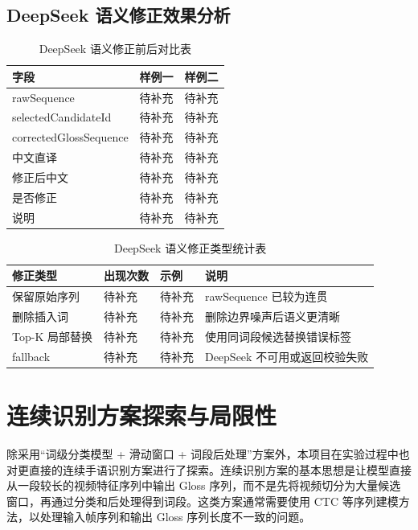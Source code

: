 \subsection{DeepSeek 语义修正效果分析}

\begin{longtable}{L{0.22\textwidth} L{0.33\textwidth} L{0.33\textwidth}}
  \caption{DeepSeek 语义修正前后对比表}
  \label{tab:chapter06-deepseek-before-after}\\
  \toprule
  字段 & 样例一 & 样例二 \\
  \midrule
  rawSequence & 待补充 & 待补充 \\
  selectedCandidateId & 待补充 & 待补充 \\
  correctedGlossSequence & 待补充 & 待补充 \\
  中文直译 & 待补充 & 待补充 \\
  修正后中文 & 待补充 & 待补充 \\
  是否修正 & 待补充 & 待补充 \\
  说明 & 待补充 & 待补充 \\
  \bottomrule
\end{longtable}

\begin{longtable}{L{0.20\textwidth} L{0.16\textwidth} L{0.26\textwidth} L{0.34\textwidth}}
  \caption{DeepSeek 语义修正类型统计表}
  \label{tab:chapter06-deepseek-correction-types}\\
  \toprule
  修正类型 & 出现次数 & 示例 & 说明 \\
  \midrule
  保留原始序列 & 待补充 & 待补充 & rawSequence 已较为连贯 \\
  删除插入词 & 待补充 & 待补充 & 删除边界噪声后语义更清晰 \\
  Top-K 局部替换 & 待补充 & 待补充 & 使用同词段候选替换错误标签 \\
  fallback & 待补充 & 待补充 & DeepSeek 不可用或返回校验失败 \\
  \bottomrule
\end{longtable}

\section{连续识别方案探索与局限性}

除采用“词级分类模型 + 滑动窗口 + 词段后处理”方案外，本项目在实验过程中也对更直接的连续手语识别方案进行了探索。连续识别方案的基本思想是让模型直接从一段较长的视频特征序列中输出 Gloss 序列，而不是先将视频切分为大量候选窗口，再通过分类和后处理得到词段。这类方案通常需要使用 CTC 等序列建模方法，以处理输入帧序列和输出 Gloss 序列长度不一致的问题。

